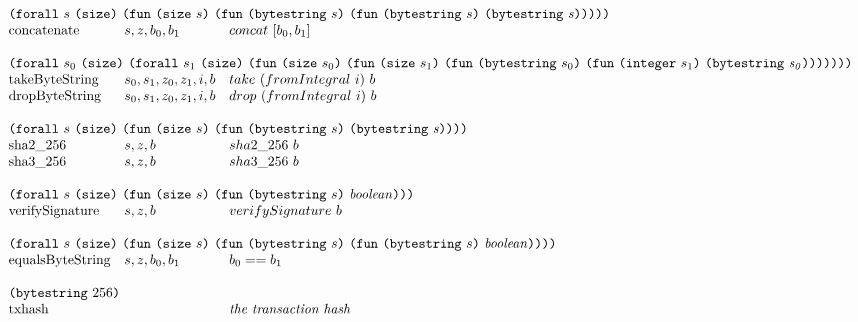 \documentclass[../main.tex]{subfiles}
\begin{document}
\begin{figure*}[t]
\[\begin{array}{lll}
        \multicolumn{3}{l}{\forallT{s}{\sizeK{}}{\funT{\sizeT{s}}{\funT{\bytestringT{s}}{\funT{\bytestringT{s}}{\mathit{\bytestringT{s}}}}}}}\\
        \mathrm{concatenate}       &   s, z, b_0 , b_1   & concat ~ [b_0,b_1]               \\
        &&\\
        
        \multicolumn{3}{l}{\forallT{s_0}{\sizeK{}}{\forallT{s_1}{\sizeK{}}{\funT{\sizeT{s_0}}{\funT{\sizeT{s_1}}{\funT{\bytestringT{s_0}}{\funT{\integerT{s_1}}{\mathit{\bytestringT{s_0}}}}}}}}}\\
        \mathrm{takeByteString}    &   s_0, s_1, z_0, z_1, i, b     & take ~ (fromIntegral ~ i) ~ b    \\
        \mathrm{dropByteString}    &   s_0, s_1, z_0, z_1, i, b     & drop ~ (fromIntegral ~ i) ~ b    \\
        &&\\
        
        \multicolumn{3}{l}{\forallT{s}{\sizeK{}}{\funT{\sizeT{s}}{\funT{\bytestringT{s}}{\mathit{\bytestringT{s}}}}}}\\
        \mathrm{sha2\_256}         &   s, z, b           & sha2\_256 ~ b                    \\
        \mathrm{sha3\_256}         &   s, z, b           & sha3\_256~ b                     \\
        &&\\
        
        \multicolumn{3}{l}{\forallT{s}{\sizeK{}}{\funT{\sizeT{s}}{\funT{\bytestringT{s}}{\mathit{\mathit{boolean}}}}}}\\
        \mathrm{verifySignature}   &   s, z, b           & verifySignature ~ b              \\
        &&\\
        
        \multicolumn{3}{l}{\forallT{s}{\sizeK{}}{\funT{\sizeT{s}}{\funT{\bytestringT{s}}{\funT{\bytestringT{s}}{\mathit{\mathit{boolean}}}}}}}\\
        \mathrm{equalsByteString}  &   s, z, b_0 , b_1   & b_0 == b_1   \\
        &&\\
        
        \multicolumn{3}{l}{\bytestringT{256}}\\
        \mathrm{txhash} & & \textit{the transaction hash}\\
        &&\\
        

\end{array}\]
\end{figure*}
\end{document}

